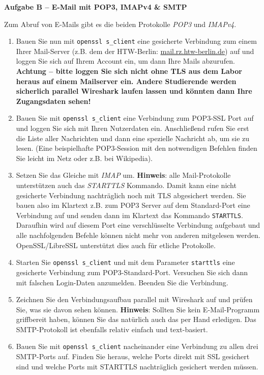 \documentclass[paper=a4,fontsize=11pt]{scrartcl}%
\numberwithin{equation}{section}
\begin{document}
\begin{center}\Large{\textbf{Aufgabe B -- E-Mail mit POP3, IMAPv4 \& SMTP}}\end{center}\vskip0.25in
Zum Abruf von E-Mails gibt es die beiden Protokolle \emph{POP3} und \emph{IMAPv4}.
\begin{enumerate}
	\item Bauen Sie nun mit \texttt{openssl s\_client} eine gesicherte Verbindung zum einem Ihrer Mail-Server (z.B. dem der HTW-Berlin: \url{mail.rz.htw-berlin.de}) auf und loggen Sie sich auf Ihrem Account ein, um dann Ihre Mails abzurufen.\\
	{\color{red}\textbf{Achtung -- bitte loggen Sie sich nicht ohne TLS aus dem Labor heraus auf einem Mailserver ein. Andere Studierende werden sicherlich parallel Wireshark  laufen lassen und könnten dann Ihre Zugangsdaten sehen!}}
	\item Bauen Sie mit \texttt{openssl s\_client} eine Verbindung zum POP3-SSL Port auf und loggen Sie sich mit Ihren Nutzerdaten ein. Anschließend rufen Sie erst die Liste aller Nachrichten und dann eine spezielle Nachricht ab, um sie zu lesen. (Eine beispielhafte POP3-Session mit den notwendigen Befehlen finden Sie leicht im Netz oder z.B. bei Wikipedia).
	\item Setzen Sie das Gleiche mit \emph{IMAP} um.
	\textbf{Hinweis}: alle Mail-Protokolle unterstützen auch das \emph{STARTTLS} Kommando. Damit kann eine nicht gesicherte Verbindung nachträglich noch mit TLS abgesichert werden. Sie bauen also im Klartext z.B. zum POP3 Server auf dem Standard-Port eine Verbindung auf und senden dann im Klartext das Kommando \texttt{STARTTLS}. Daraufhin wird auf diesem Port eine verschlüsselte Verbindung aufgebaut und alle nachfolgenden Befehle können nicht mehr von anderen mitgelesen werden. OpenSSL/LibreSSL unterstützt dies auch für etliche Protokolle.
	\item Starten Sie \texttt{openssl s\_client} und mit dem Parameter \texttt{starttls} eine gesicherte Verbindung zum POP3-Standard-Port. Versuchen Sie sich dann mit falschen Login-Daten anzumelden. Beenden Sie die Verbindung.
 	\item Zeichnen Sie den Verbindungsaufbau parallel mit Wireshark auf und prüfen Sie, was sie davon sehen können.
	\textbf{Hinweis}: Sollten Sie kein E-Mail-Programm griffbereit haben, können Sie das natürlich auch das per Hand erledigen. Das SMTP-Protokoll ist ebenfalls relativ einfach und text-basiert.
 	\item Bauen Sie mit \texttt{openssl s\_client} nacheinander eine Verbindung zu allen drei SMTP-Ports auf. Finden Sie heraus, welche Ports direkt mit SSL gesichert sind und welche Ports mit STARTTLS nachträglich gesichert werden müssen.

\end{enumerate}
\end{document}
